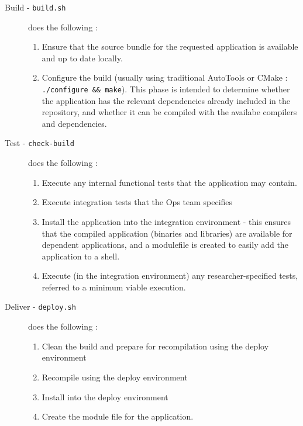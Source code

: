 \documentclass[a4paper]{jpconf}
\begin{document}
  \begin{description}
    \item[Build - \texttt{build.sh}] does the following :
      \begin{enumerate}[label=\arabic*]
        \item Ensure that the source bundle for the requested application is available and up to date locally.
        \item Configure the build (usually using traditional AutoTools \cite{AutoTools} or CMake \cite{CMake} : \texttt{./configure \&\& make}). This phase is intended to determine whether the application has the relevant dependencies already included in the repository, and whether it can be compiled with the availabe compilers and dependencies.
      \end{enumerate}
    \item[Test - \texttt{check-build}] does the following :
      \begin{enumerate}[label=\arabic*]
        \item Execute any internal functional tests that the application may contain.
        \item Execute integration tests that the Ops team specifies
        \item Install the application into the integration environment - this ensures that the compiled application (binaries and libraries) are available for dependent applications, and a modulefile is created to easily add the application to a shell.
        \item Execute (in the integration environment) any researcher-specified tests, referred to a minimum viable execution.
      \end{enumerate}
    \item[Deliver - \texttt{deploy.sh}] does the following :
      \begin{enumerate}[label=\arabic* ]
        \item Clean the build and prepare for recompilation using the deploy environment
        \item Recompile using the deploy environment
        \item Install into the deploy environment
        \item Create the module file for the application.
      \end{enumerate}
  \end{description}

\end{document}
